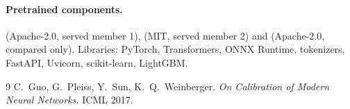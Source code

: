 \documentclass[11pt,a4paper]{article}
\begin{document}
\paragraph{Pretrained components.} 
(Apache-2.0, served member 1),  (MIT, served
member 2) and  (Apache-2.0, compared
only). Libraries: PyTorch, Transformers, ONNX Runtime, tokenizers,
FastAPI, Uvicorn, scikit-learn, LightGBM.

\begin{thebibliography}{9}
 C.~Guo, G.~Pleiss, Y.~Sun, K.~Q.~Weinberger.
  \emph{On Calibration of Modern Neural Networks.} ICML 2017.
\end{thebibliography}
\end{document}
